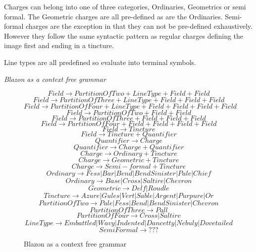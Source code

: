 Charges can belong into one of three categories, Ordinaries, Geometrics or semi formal.  The Geometric charges are all pre-defined as are the Ordinaries.  Semi-formal charges are the exception in that they can not be pre-defined exhaustively.  However they follow the same syntactic pattern as regular charges defining the image first and ending in a tincture.


Line types are all predefined so evaluate into terminal symbols. 


\emph{Blazon as a context free grammar}
\begin{figure}[H]


 \[
  Field \to  Partition  Of  Two + Line Type + Field + Field   \] \[
  Field \to  Partition  Of  Three + Line Type  + Field + Field + Field   \] \[
  Field \to  Partition  Of  Four + Line Type  + Field + Field + Field + Field \] \[
  Field \to  Partition  Of  Two  + Field + Field   \] \[
  Field \to  Partition  Of  Three + Field + Field + Field   \] \[
  Field \to  Partition  Of  Four + Field + Field + Field + Field \] \[
  Field \to  Tincture \] \[
  Field \to Tincture + Quantifier \] 
  \[Quantifier \to Charge\]
  \[Quantifier \to Charge + Quantifier\]
  \[Charge \to Ordinary  + Tincture \] \[
  Charge \to Geometric  + Tincture \] \[
  Charge \to Semi-formal + Tincture \] \[
  Ordinary \to Fess | Bar | Bend | Bend Sinister | Pale | Chief \]
  \[Ordinary \to Base | Cross | Saltire | Chevron  \] \[
  Geometric \to Delf | Roudle  \] \[
  Tincture \to Azure | Gules | Vert | Sable | Argent | Purpure | Or \] \[
  Partition  Of  Two \to Pale | Fess | Bend | Bend Sinister | Chevron \] \[
  Partition  Of  Three \to Pall \] \[
  Partition  Of  Four \to  Cross | Saltire  \] \[
  Line Type \to Embattled | Wavy | Indented | Dancetty | Nebuly | Dovetailed  \]
  \[ Semi Formal \to ???  \] 

\caption{Blazon as a context free grammar}
\end{figure}


